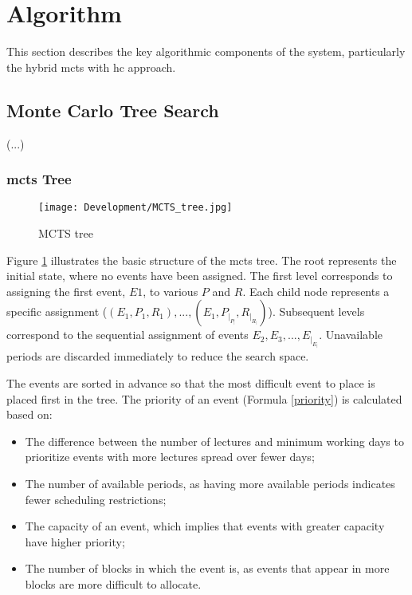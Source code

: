 
\section{Algorithm}

This section describes the key algorithmic components of the system, particularly the hybrid \ac{mcts} with \ac{hc} approach.

\subsection{Monte Carlo Tree Search}

(...)

\subsubsection{\ac{mcts} Tree}

\begin{figure}
      \centering
      \texttt{[image: Development/MCTS\_tree.jpg]}
      \caption[MCTS tree]
      {MCTS tree}
      \label{fig:mcts_tree}
\end{figure}

Figure \ref{fig:mcts_tree} illustrates the basic structure of the \ac{mcts} tree. The root represents the initial state, where no events have been assigned. The first level corresponds to assigning the first event, \(E1\), to various \(P\) and \(R\). Each child node represents a specific assignment (\((E_1,P_1,R_1),...,(E_1,P_|_P_|,R_|_R_|)\)). Subsequent levels correspond to the sequential assignment of events \(E_2, E_3, ..., E_|_E_|\). Unavailable periods are discarded immediately to reduce the search space.

The events are sorted in advance so that the most difficult event to place is placed first in the tree. The priority of an event (Formula \ref{priority}) is calculated based on:
\begin{itemize}
\item The difference between the number of lectures and minimum working days to prioritize events with more lectures spread over fewer days;
\item The number of available periods, as having more available periods indicates fewer scheduling restrictions;
\item The capacity of an event, which implies that events with greater capacity have higher priority;
\item The number of blocks in which the event is, as events that appear in more blocks are more difficult to allocate.
\end{itemize}

